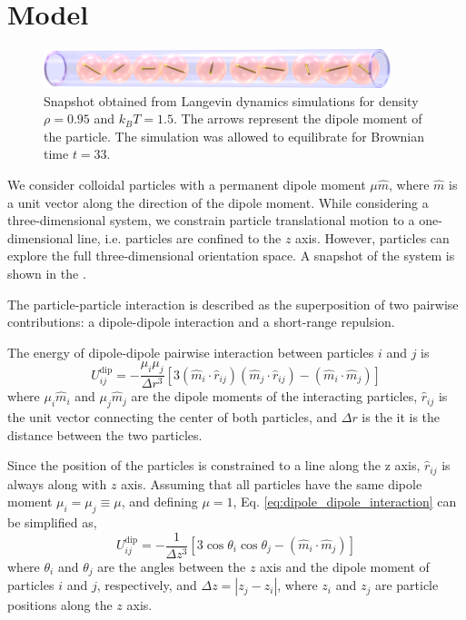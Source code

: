 \section{Model}
\label{sec:model}

\begin{figure}[t]
\centering
	\includegraphics[width=0.9\textwidth]{Images/fullSystemPicture}
	\caption{Snapshot obtained from Langevin dynamics simulations for density $\rho = 0.95$ and $k_BT = 1.5$. The arrows represent the dipole moment of the particle. The simulation was allowed to equilibrate for Brownian time $t = 33$.}
	\label{fig:fullSystemPicture}
\end{figure}

We consider colloidal particles with a permanent dipole moment $\mu \hat{m}$, where $\hat{m}$ is a unit vector along the direction of the dipole moment. While considering a three-dimensional system, we constrain particle translational motion to a one-dimensional line, i.e. particles are confined to the $z$ axis. However, particles can explore the full three-dimensional orientation space. A snapshot of the system is shown in the .

The particle-particle interaction is described as the superposition of two pairwise contributions: a dipole-dipole interaction and a short-range repulsion.

The energy of dipole-dipole pairwise interaction between particles $i$ and $j$ is
\begin{equation}
\label{eq:dipole_dipole_interaction}
U^\mathrm{dip}_{ij} =
	- \frac{\mu_i \mu_j}{\Delta r^3}[
		3 (\hat{m}_i \cdot \hat{r}_{ij})(\hat{m}_j \cdot \hat{r}_{ij})
		- (\hat{m}_i \cdot \hat{m}_j)
	]
\end{equation}
where $\mu_i \hat{m}_i$ and $\mu_j \hat{m}_j$ are the dipole moments of the interacting particles, $\hat{r}_{ij}$ is the unit vector connecting the center of both particles, and $\Delta r$ is the it is the distance between the two particles.

Since the position of the particles is constrained to a line along the z axis, $\hat{r}_{ij}$ is always along with $z$ axis. Assuming that all particles have the same dipole moment $\mu_i = \mu_j \equiv \mu$, and defining $\mu = 1$, Eq. \eqref{eq:dipole_dipole_interaction} can be simplified as,
\begin{equation}
\label{eq:dipole_dipole_1D}
U_{ij}^\mathrm{dip} = - \frac{1}{\Delta z^3} [3 \cos \theta_i \cos \theta_j - (\hat{m}_i \cdot \hat{m}_j)]
\end{equation}
where $\theta_i$ and $\theta_j$ are the angles between the $z$ axis and the dipole moment of particles $i$ and $j$, respectively, and $\Delta z = |z_j - z_i|$, where $z_i$ and $z_j$ are particle positions along the $z$ axis.

